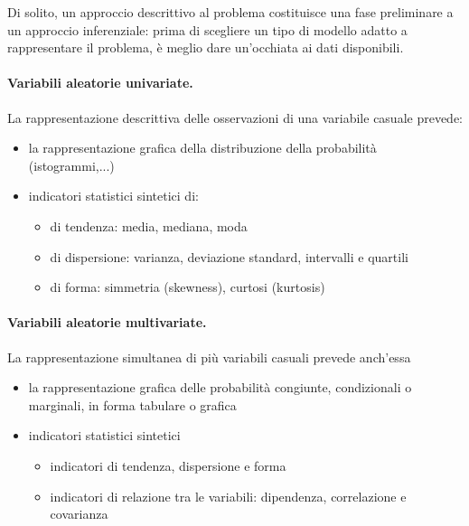 Di solito, un approccio descrittivo al problema costituisce una fase preliminare a un approccio inferenziale: prima di scegliere un tipo di modello adatto a rappresentare il problema, è meglio dare un'occhiata ai dati disponibili. \vspace{10pt}

\paragraph{Variabili aleatorie univariate.} La rappresentazione descrittiva delle osservazioni di una variabile casuale prevede:
\begin{itemize}
  \item la rappresentazione grafica della distribuzione della probabilità (istogrammi,...)
  \item indicatori statistici sintetici di:
  \begin{itemize}
    \item di tendenza: media, mediana, moda
    \item di dispersione: varianza, deviazione standard, intervalli e quartili
    \item di forma: simmetria (skewness), curtosi (kurtosis)
  \end{itemize}
\end{itemize}
\paragraph{Variabili aleatorie multivariate.} La rappresentazione simultanea di più variabili casuali prevede anch'essa
\begin{itemize}
  \item la rappresentazione grafica delle probabilità congiunte, condizionali o marginali, in forma tabulare o grafica
  \item indicatori statistici sintetici
  \begin{itemize}
    \item indicatori di tendenza, dispersione e forma
    \item indicatori di relazione tra le variabili: dipendenza, correlazione e covarianza
  \end{itemize}
\end{itemize}


